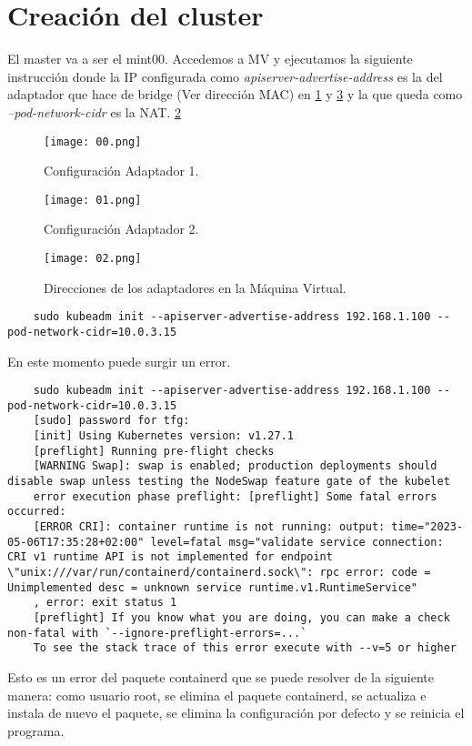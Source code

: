 \documentclass[../main.tex]{subfiles}
\begin{document}
\section{Creación del cluster}
El master va a ser el mint00. Accedemos a MV y ejecutamos la siguiente instrucción donde la IP configurada como \textit{apiserver-advertise-address} es la del adaptador que hace de bridge (Ver dirección MAC) en \ref{adaptador1} y \ref{adaptadorconfig} y la que queda como \textit{--pod-network-cidr} es la NAT. \ref{adaptador2}

\begin{figure}[!h]
	\texttt{[image: 00.png]}
	\caption{Configuración Adaptador 1.}
	\label{adaptador1}
\end{figure} 
\begin{figure}[!h]
	\texttt{[image: 01.png]}
	\caption{Configuración Adaptador 2.}
	\label{adaptador2}
\end{figure} 
\begin{figure}[!h]
	\texttt{[image: 02.png]}
	\caption{Direcciones de los adaptadores en la Máquina Virtual.}
	\label{adaptadorconfig}
\end{figure} 


\begin{lstlisting} 
	sudo kubeadm init --apiserver-advertise-address 192.168.1.100 --pod-network-cidr=10.0.3.15
\end{lstlisting}
En este momento puede surgir un error. 
\begin{lstlisting}
	sudo kubeadm init --apiserver-advertise-address 192.168.1.100 --pod-network-cidr=10.0.3.15
	[sudo] password for tfg:
	[init] Using Kubernetes version: v1.27.1
	[preflight] Running pre-flight checks
	[WARNING Swap]: swap is enabled; production deployments should disable swap unless testing the NodeSwap feature gate of the kubelet
	error execution phase preflight: [preflight] Some fatal errors occurred:
	[ERROR CRI]: container runtime is not running: output: time="2023-05-06T17:35:28+02:00" level=fatal msg="validate service connection: CRI v1 runtime API is not implemented for endpoint \"unix:///var/run/containerd/containerd.sock\": rpc error: code = Unimplemented desc = unknown service runtime.v1.RuntimeService"
	, error: exit status 1
	[preflight] If you know what you are doing, you can make a check non-fatal with `--ignore-preflight-errors=...`
	To see the stack trace of this error execute with --v=5 or higher	
\end{lstlisting}
Esto es un error del paquete containerd que se puede resolver de la siguiente manera:
como usuario root, se elimina el paquete containerd, se actualiza e instala de nuevo el paquete, se elimina la configuración por defecto y se reinicia el programa.
\end{document}
